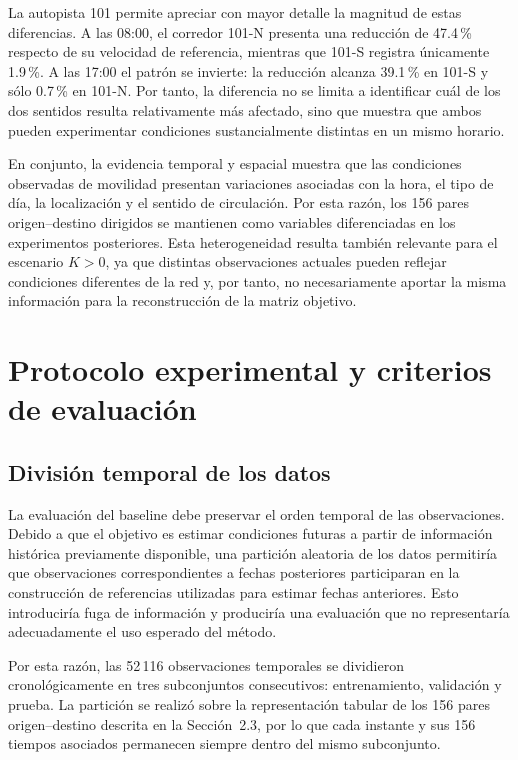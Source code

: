 \documentclass[11pt]{article}
\begin{document}
La autopista 101 permite apreciar con mayor detalle la magnitud de estas diferencias. A las 08:00, el corredor 101-N presenta una reducción de 47.4\,\% respecto de su velocidad de referencia, mientras que 101-S registra únicamente 1.9\,\%. A las 17:00 el patrón se invierte: la reducción alcanza 39.1\,\% en 101-S y sólo 0.7\,\% en 101-N. Por tanto, la diferencia no se limita a identificar cuál de los dos sentidos resulta relativamente más afectado, sino que muestra que ambos pueden experimentar condiciones sustancialmente distintas en un mismo horario.

En conjunto, la evidencia temporal y espacial muestra que las condiciones observadas de movilidad presentan variaciones asociadas con la hora, el tipo de día, la localización y el sentido de circulación. Por esta razón, los 156 pares origen--destino dirigidos se mantienen como variables diferenciadas en los experimentos posteriores. Esta heterogeneidad resulta también relevante para el escenario $K>0$, ya que distintas observaciones actuales pueden reflejar condiciones diferentes de la red y, por tanto, no necesariamente aportar la misma información para la reconstrucción de la matriz objetivo.

\section{Protocolo experimental y criterios de evaluación}

\subsection{División temporal de los datos}

La evaluación del baseline debe preservar el orden temporal de las observaciones. Debido a que el objetivo es estimar condiciones futuras a partir de información histórica previamente disponible, una partición aleatoria de los datos permitiría que observaciones correspondientes a fechas posteriores participaran en la construcción de referencias utilizadas para estimar fechas anteriores. Esto introduciría fuga de información y produciría una evaluación que no representaría adecuadamente el uso esperado del método.

Por esta razón, las 52\,116 observaciones temporales se dividieron cronológicamente en tres subconjuntos consecutivos: entrenamiento, validación y prueba. La partición se realizó sobre la representación tabular de los 156 pares origen--destino descrita en la Sección~2.3, por lo que cada instante y sus 156 tiempos asociados permanecen siempre dentro del mismo subconjunto.
\end{document}
